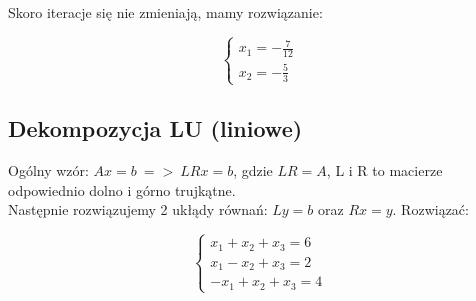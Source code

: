 \documentclass{article}
\begin{document}
Skoro iteracje się nie zmieniają, mamy rozwiązanie:

\begin{equation*}\begin{cases}
    x_1=-\frac{7}{12}\\
    x_2=-\frac{5}{3}
\end{cases}\end{equation*}

\subsection{Dekompozycja LU (liniowe)}
Ogólny wzór: $Ax=b\:=>\:LRx=b$, gdzie $LR=A$, L i R to macierze odpowiednio dolno i górno trujkątne.\\
Następnie rozwiązujemy 2 ukłądy równań: $Ly=b$ oraz $Rx=y$.
Rozwiązać:

\begin{equation*}\begin{cases}
    x_1+x_2+x_3=6\\
    x_1-x_2+x_3=2\\
    -x_1+x_2+x_3=4
\end{cases}\end{equation*}
\end{document}
